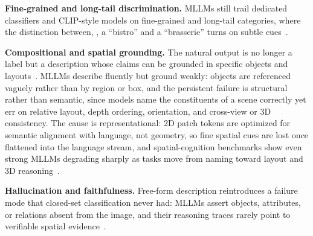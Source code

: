 \textbf{Fine-grained and long-tail discrimination.} MLLMs still trail dedicated classifiers and CLIP-style models on fine-grained and long-tail categories, where the distinction between, \eg, a ``bistro'' and a ``brasserie'' turns on subtle cues~\cite{NEURIPS2024_5c702404}.

\textbf{Compositional and spatial grounding.} The natural output is no longer a label but a description whose claims can be grounded in specific objects and layouts~\cite{chen2023clip2scene}.
MLLMs describe fluently but ground weakly: objects are referenced vaguely rather than by region or box, and the persistent failure is structural rather than semantic, since models name the constituents of a scene correctly yet err on relative layout, depth ordering, orientation, and cross-view or 3D consistency.
The cause is representational: 2D patch tokens are optimized for semantic alignment with language, not geometry, so fine spatial cues are lost once flattened into the language stream, and spatial-cognition benchmarks show even strong MLLMs degrading sharply as tasks move from naming toward layout and 3D reasoning~\cite{xu2025spatialbench,daxberger2025mmspatial}.

\textbf{Hallucination and faithfulness.} Free-form description reintroduces a failure mode that closed-set classification never had: MLLMs assert objects, attributes, or relations absent from the image, and their reasoning traces rarely point to verifiable spatial evidence~\cite{daxberger2025mmspatial}.
